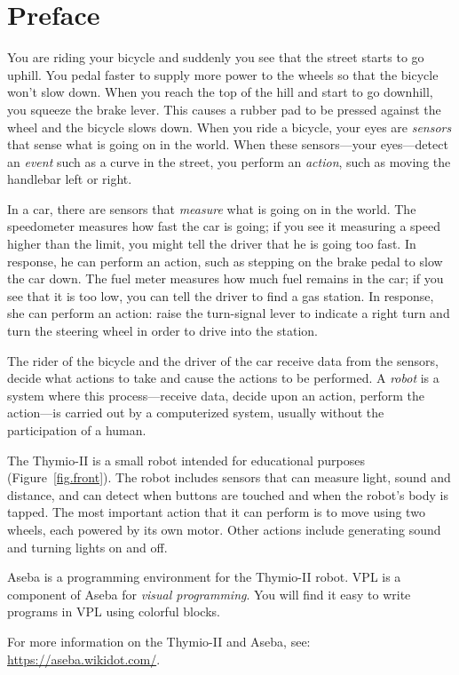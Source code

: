 \chapter*{Preface}


You are riding your bicycle and suddenly you see that the street starts
to go uphill. You pedal faster to supply more power to the wheels so
that the bicycle won't slow down. When you reach the top of the hill and
start to go downhill, you squeeze the brake lever. This causes a rubber
pad to be pressed against the wheel and the bicycle slows down.
When you ride a bicycle, your eyes are \emph{sensors} that sense what is
going on in the world. When these sensors---your eyes---detect an
\emph{event} such as a curve in the street, you perform an
\emph{action}, such as moving the handlebar left or right.

In a car, there are sensors that \emph{measure} what is going on in the
world. The speedometer measures how fast the car is going; if you see it
measuring a speed higher than the limit, you might tell the driver that
he is going too fast. In response, he can perform an action, such as
stepping on the brake pedal to slow the car down. The fuel meter
measures how much fuel remains in the car; if you see that it is too
low, you can tell the driver to find a gas station. In response, she can
perform an action: raise the turn-signal lever to indicate a right turn
and turn the steering wheel in order to drive into the station.

The rider of the bicycle and the driver of the car receive data from
the sensors, decide what actions to take and cause the actions to be
performed. A \emph{robot} is a system where this process---receive data,
decide upon an action, perform the action---is carried out by a
computerized system, usually without the participation of a human.


The Thymio-II is a small robot intended for educational purposes
(Figure~\ref{fig.front}). The robot includes sensors that can measure
light, sound and distance, and can detect when buttons are touched and
when the robot's body is tapped. The most important action that it can
perform is to move using two wheels, each powered by its own motor.
Other actions include generating sound and turning lights on and off.

Aseba is a programming environment for the Thymio-II robot. VPL is a
component of Aseba for \emph{visual programming}. You will find it easy
to write programs in VPL using colorful blocks.

For more information on the Thymio-II and Aseba, see: \url{https://aseba.wikidot.com/}.

